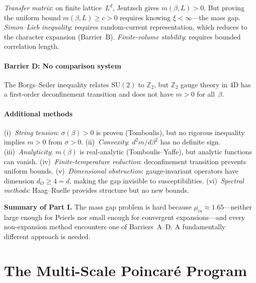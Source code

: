 \documentclass[12pt,a4paper]{article}
\newcommand{\Z}{\mathbb{Z}}
\begin{document}
\emph{Transfer matrix}: on finite lattice~$L^d$, Jentzsch gives $m(\beta,L)>0$. But proving the uniform bound $m(\beta,L)\ge c>0$ requires knowing $\xi<\infty$---the mass gap. \emph{Simon--Lieb inequality}: requires random-current representation, which reduces to the character expansion (Barrier~B). \emph{Finite-volume stability}: requires bounded correlation length.

\subsection{Barrier D: No comparison system}

The Borgs--Seiler inequality relates $\mathrm{SU}(2)$ to $\Z_2$, but $\Z_2$ gauge theory in 4D has a first-order deconfinement transition and does not have $m>0$ for all~$\beta$.

\subsection{Additional methods}

(i)~\emph{String tension}: $\sigma(\beta)>0$ is proven (Tomboulis), but no rigorous inequality implies $m>0$ from $\sigma>0$. (ii)~\emph{Convexity}: $d^2m/d\beta^2$ has no definite sign. (iii)~\emph{Analyticity}: $m(\beta)$ is real-analytic (Tomboulis--Yaffe), but analytic functions can vanish. (iv)~\emph{Finite-temperature reduction}: deconfinement transition prevents uniform bounds. (v)~\emph{Dimensional obstruction}: gauge-invariant operators have dimension $d_O\ge 4=d$, making the gap invisible to susceptibilities. (vi)~\emph{Spectral methods}: Haag--Ruelle provides structure but no new bounds.

\vspace{1em}
\noindent\textbf{Summary of Part I.} The mass gap problem is hard because $\mu_{\mathrm{cs}}\approx 1.65$---neither large enough for Peierls nor small enough for convergent expansions---and every non-expansion method encounters one of Barriers~A--D. A fundamentally different approach is needed.


\part{The Multi-Scale Poincar\'e Program}
\end{document}
